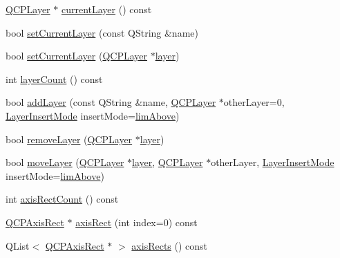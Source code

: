 \begin{DoxyCompactItemize}
\item 
\hyperlink{class_q_c_p_layer}{Q\+C\+P\+Layer} $\ast$ \hyperlink{class_q_custom_plot_a0421d647f420b0b4c57aec1708857af5}{current\+Layer} () const
\item 
bool \hyperlink{class_q_custom_plot_a73a6dc47c653bb6f8f030abca5a11852}{set\+Current\+Layer} (const Q\+String \&name)
\item 
bool \hyperlink{class_q_custom_plot_a23a4d3cadad1a0063c5fe19aac5659e6}{set\+Current\+Layer} (\hyperlink{class_q_c_p_layer}{Q\+C\+P\+Layer} $\ast$\hyperlink{class_q_custom_plot_a0a96244e7773b242ef23c32b7bdfb159}{layer})
\item 
int \hyperlink{class_q_custom_plot_afa45d61e65292026f4c58c9c88c2cef0}{layer\+Count} () const
\item 
bool \hyperlink{class_q_custom_plot_ad5255393df078448bb6ac83fa5db5f52}{add\+Layer} (const Q\+String \&name, \hyperlink{class_q_c_p_layer}{Q\+C\+P\+Layer} $\ast$other\+Layer=0, \hyperlink{class_q_custom_plot_a75a8afbe6ef333b1f3d47abb25b9add7}{Layer\+Insert\+Mode} insert\+Mode=\hyperlink{class_q_custom_plot_a75a8afbe6ef333b1f3d47abb25b9add7a062b0b7825650b432a713c0df6742d41}{lim\+Above})
\item 
bool \hyperlink{class_q_custom_plot_a40f75e342c5eaab6a86066a42a0e2a94}{remove\+Layer} (\hyperlink{class_q_c_p_layer}{Q\+C\+P\+Layer} $\ast$\hyperlink{class_q_custom_plot_a0a96244e7773b242ef23c32b7bdfb159}{layer})
\item 
bool \hyperlink{class_q_custom_plot_ae896140beff19424e9e9e02d6e331104}{move\+Layer} (\hyperlink{class_q_c_p_layer}{Q\+C\+P\+Layer} $\ast$\hyperlink{class_q_custom_plot_a0a96244e7773b242ef23c32b7bdfb159}{layer}, \hyperlink{class_q_c_p_layer}{Q\+C\+P\+Layer} $\ast$other\+Layer, \hyperlink{class_q_custom_plot_a75a8afbe6ef333b1f3d47abb25b9add7}{Layer\+Insert\+Mode} insert\+Mode=\hyperlink{class_q_custom_plot_a75a8afbe6ef333b1f3d47abb25b9add7a062b0b7825650b432a713c0df6742d41}{lim\+Above})
\item 
int \hyperlink{class_q_custom_plot_a8f85940aaac50efb466287d9d2d04ec6}{axis\+Rect\+Count} () const
\item 
\hyperlink{class_q_c_p_axis_rect}{Q\+C\+P\+Axis\+Rect} $\ast$ \hyperlink{class_q_custom_plot_ae5eefcb5f6ca26689b1fd4f6e25b42f9}{axis\+Rect} (int index=0) const
\item 
Q\+List$<$ \hyperlink{class_q_c_p_axis_rect}{Q\+C\+P\+Axis\+Rect} $\ast$ $>$ \hyperlink{class_q_custom_plot_a12af771429e2d7e313c8c5d5fca068fe}{axis\+Rects} () const
\item 

\end{DoxyCompactItemize}
